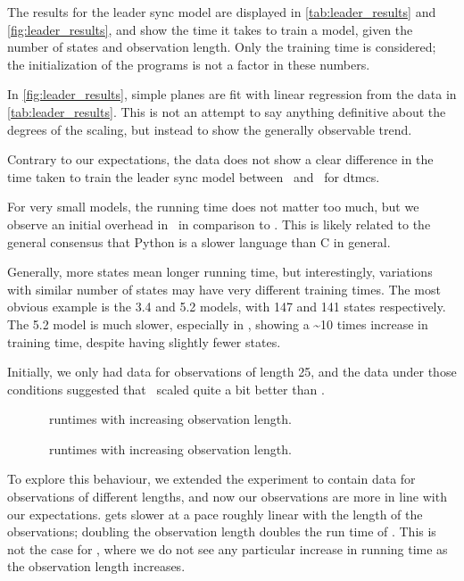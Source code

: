 The results for the leader sync model are displayed in \autoref{tab:leader_results} and \autoref{fig:leader_results}, and show the time it takes to train a model, given the number of states and observation length.
Only the training time is considered; the initialization of the programs is not a factor in these numbers.

In \autoref{fig:leader_results}, simple planes are fit with linear regression from the data in \autoref{tab:leader_results}.
This is not an attempt to say anything definitive about the degrees of the scaling, but instead to show the generally observable trend.

Contrary to our expectations, the data does not show a clear difference in the time taken to train the leader sync model between \Jajapy\ and \Cupaal\ for \glspl{dtmc}.

For very small models, the running time does not matter too much, but we observe an initial overhead in \Jajapy\ in comparison to \Cupaal.
This is likely related to the general consensus that Python is a slower language than C in general.

Generally, more states mean longer running time, but interestingly, variations with similar number of states may have very different training times.
The most obvious example is the 3.4 and 5.2 models, with 147 and 141 states respectively.
The 5.2 model is much slower, especially in \Cupaal, showing a \textasciitilde10 times increase in training time, despite having slightly fewer states.

Initially, we only had data for observations of length 25, and the data under those conditions suggested that \Jajapy\ scaled quite a bit better than \Cupaal.

\begin{figure}[htb!]
    
    \caption{\Cupaal\ runtimes with increasing observation length.}
    \label{fig:cupaal-length-to-runtime}
\end{figure}


\begin{figure}[htb!]
    
    \caption{\Jajapy\ runtimes with increasing observation length.}
    \label{fig:jajapy-length-to-runtime}
\end{figure}


To explore this behaviour, we extended the experiment to contain data for observations of different lengths, and now our observations are more in line with our expectations.
\Jajapy gets slower at a pace roughly linear with the length of the observations; doubling the observation length doubles the run time of \Jajapy.
This is not the case for \Cupaal, where we do not see any particular increase in running time as the observation length increases.

